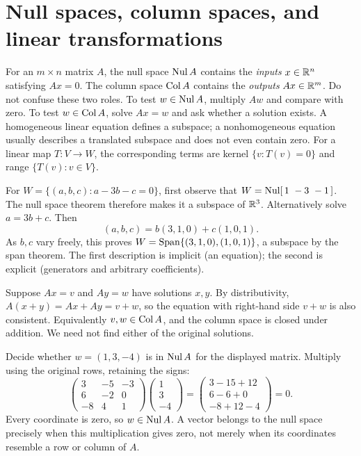 \section{Null spaces, column spaces, and linear transformations}
For an $m\times n$ matrix $A$, the null space $\operatorname{Nul} A$ contains the
\emph{inputs} $x\in\mathbb{R}^n$ satisfying $Ax=0$. The column space $\operatorname{Col} A$
contains the \emph{outputs} $Ax\in\mathbb{R}^m$. Do not confuse these two roles.
To test $w\in\operatorname{Nul} A$, multiply $Aw$ and compare with zero. To test
$w\in\operatorname{Col} A$, solve $Ax=w$ and ask whether a solution exists.
A homogeneous linear equation defines a subspace; a nonhomogeneous equation
usually describes a translated subspace and does not even contain zero.
For a linear map $T:V\to W$, the corresponding terms are kernel
$\{v:T(v)=0\}$ and range $\{T(v):v\in V\}$.

For $W=\{(a,b,c):a-3b-c=0\}$, first observe that
$W=\Nul[\,1\ -3\ -1\,]$. The null space theorem therefore makes it a
subspace of $\mathbb{R}^3$.
Alternatively solve $a=3b+c$. Then
\[
 (a,b,c)=b(3,1,0)+c(1,0,1).
\]
As $b,c$ vary freely, this proves
$W=\operatorname{Span}\{(3,1,0),(1,0,1)\}$, a subspace by the span theorem.
The first description is implicit (an equation); the second is explicit
(generators and arbitrary coefficients).

Suppose $Ax=v$ and $Ay=w$ have solutions $x,y$. By distributivity,
$A(x+y)=Ax+Ay=v+w$, so the equation with right-hand side $v+w$ is
also consistent. Equivalently $v,w\in\operatorname{Col} A$, and the column space is
closed under addition. We need not find either of the original solutions.

\goal Decide whether $w=(1,3,-4)$ is in $\operatorname{Nul} A$ for the displayed matrix.
Multiply using the original rows, retaining the signs:
\[
 \begin{pmatrix}3&-5&-3\\6&-2&0\\-8&4&1\end{pmatrix}
 \begin{pmatrix}1\\3\\-4\end{pmatrix}
 =\begin{pmatrix}3-15+12\\6-6+0\\-8+12-4\end{pmatrix}=0.
\]
Every coordinate is zero, so $w\in\operatorname{Nul} A$. A vector belongs to the null
space precisely when this multiplication gives zero, not merely when its
coordinates resemble a row or column of $A$.

